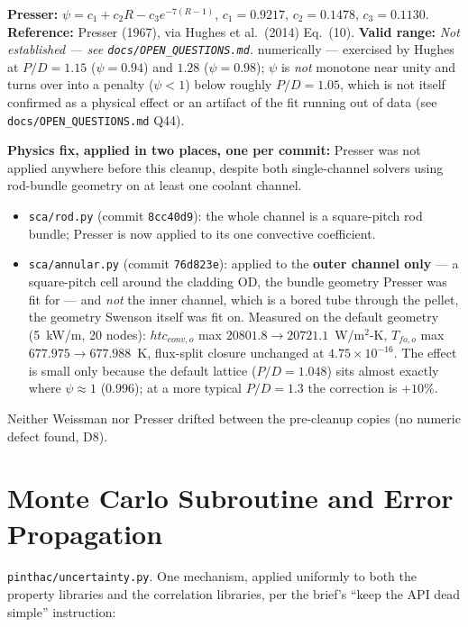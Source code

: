 \documentclass[11pt]{article}
\newcommand{\code}[1]{\texttt{#1}}
\newcommand{\notest}{\textit{Not established --- see \code{docs/OPEN\_QUESTIONS.md}.}}
\begin{document}
\textbf{Presser:} $\psi = c_1 + c_2 R - c_3 e^{-7(R-1)}$, $c_1=0.9217$, $c_2=0.1478$,
$c_3=0.1130$. \textbf{Reference:} Presser (1967), via Hughes et al.\ (2014) Eq.\ (10).
\textbf{Valid range:} \notest{} numerically --- exercised by Hughes at $P/D=1.15$
($\psi=0.94$) and $1.28$ ($\psi=0.98$); $\psi$ is \emph{not} monotone near unity and
turns over into a penalty ($\psi<1$) below roughly $P/D=1.05$, which is not itself
confirmed as a physical effect or an artifact of the fit running out of data (see
\code{docs/OPEN\_QUESTIONS.md} Q44).

\textbf{Physics fix, applied in two places, one per commit:} Presser was not applied
anywhere before this cleanup, despite both single-channel solvers using rod-bundle
geometry on at least one coolant channel.
\begin{itemize}
  \item \code{sca/rod.py} (commit \code{8cc40d9}): the whole channel is a square-pitch
    rod bundle; Presser is now applied to its one convective coefficient.
  \item \code{sca/annular.py} (commit \code{76d823e}): applied to the \textbf{outer
    channel only} --- a square-pitch cell around the cladding OD, the bundle geometry
    Presser was fit for --- and \emph{not} the inner channel, which is a bored tube
    through the pellet, the geometry Swenson itself was fit on. Measured on the default
    geometry (5~kW/m, 20 nodes): $htc_{conv,o}$ max $20801.8\to20721.1$~W/m$^2$-K,
    $T_{fo,o}$ max $677.975\to677.988$~K, flux-split closure unchanged at
    $4.75\times10^{-16}$. The effect is small only because the default lattice
    ($P/D=1.048$) sits almost exactly where $\psi\approx1$ (0.996); at a more typical
    $P/D=1.3$ the correction is $+10\%$.
\end{itemize}

Neither Weissman nor Presser drifted between the pre-cleanup copies (no numeric defect
found, D8).

\section{Monte Carlo Subroutine and Error Propagation}

\code{pinthac/uncertainty.py}. One mechanism, applied uniformly to both the property
libraries and the correlation libraries, per the brief's ``keep the API dead simple''
instruction:
\end{document}
